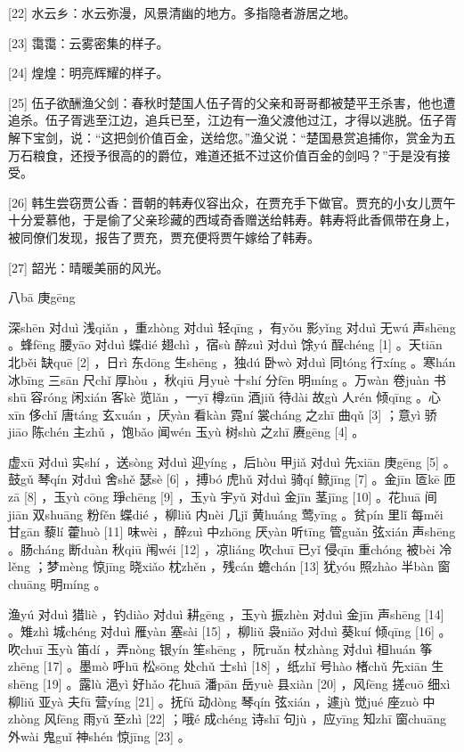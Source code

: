 \documentclass[12pt,UTF8]{ctexbook}
\begin{document}
[22] 水云乡：水云弥漫，风景清幽的地方。多指隐者游居之地。

[23] 霭霭：云雾密集的样子。

[24] 煌煌：明亮辉耀的样子。

[25] 伍子欲酬渔父剑：春秋时楚国人伍子胥的父亲和哥哥都被楚平王杀害，他也遭追杀。伍子胥逃至江边，追兵已至，江边有一渔父渡他过江，才得以逃脱。伍子胥解下宝剑，说：“这把剑价值百金，送给您。”渔父说：“楚国悬赏追捕你，赏金为五万石粮食，还授予很高的的爵位，难道还抵不过这价值百金的剑吗？”于是没有接受。

[26] 韩生尝窃贾公香：晋朝的韩寿仪容出众，在贾充手下做官。贾充的小女儿贾午十分爱慕他，于是偷了父亲珍藏的西域奇香赠送给韩寿。韩寿将此香佩带在身上，被同僚们发现，报告了贾充，贾充便将贾午嫁给了韩寿。

[27] 韶光：晴暖美丽的风光。





八bā 庚gēng


深shēn 对duì 浅qiǎn ，重zhòng 对duì 轻qīng ，有yǒu 影yǐng 对duì 无wú 声shēng 。蜂fēng 腰yāo 对duì 蝶dié 翅chì ，宿sù 醉zuì 对duì 馀yú 酲chéng [1] 。天tiān 北běi 缺quē [2] ，日rì 东dōng 生shēng ，独dú 卧wò 对duì 同tóng 行xíng 。寒hán 冰bīng 三sān 尺chǐ 厚hòu ，秋qiū 月yuè 十shí 分fēn 明míng 。万wàn 卷juàn 书shū 容róng 闲xián 客kè 览lǎn ，一yī 樽zūn 酒jiǔ 待dài 故gù 人rén 倾qīng 。心xīn 侈chǐ 唐táng 玄xuán ，厌yàn 看kàn 霓ní 裳cháng 之zhī 曲qǔ [3] ；意yì 骄jiāo 陈chén 主zhǔ ，饱bǎo 闻wén 玉yù 树shù 之zhī 赓gēng [4] 。

虚xū 对duì 实shí ，送sòng 对duì 迎yíng ，后hòu 甲jiǎ 对duì 先xiān 庚gēng [5] 。鼓gǔ 琴qín 对duì 舍shě 瑟sè [6] ，搏bó 虎hǔ 对duì 骑qí 鲸jīng [7] 。金jīn 匼kē 匝zā [8] ，玉yù cōng 琤chēng [9] ，玉yù 宇yǔ 对duì 金jīn 茎jīng [10] 。花huā 间jiān 双shuāng 粉fěn 蝶dié ，柳liǔ 内nèi 几jǐ 黄huáng 莺yīng 。贫pín 里lǐ 每měi 甘gān 藜lí 藿huò [11] 味wèi ，醉zuì 中zhōng 厌yàn 听tīng 管guǎn 弦xián 声shēng 。肠cháng 断duàn 秋qiū 闱wéi [12] ，凉liáng 吹chuī 已yǐ 侵qīn 重chóng 被bèi 冷lěng ；梦mèng 惊jīng 晓xiǎo 枕zhěn ，残cán 蟾chán [13] 犹yóu 照zhào 半bàn 窗chuāng 明míng 。

渔yú 对duì 猎liè ，钓diào 对duì 耕gēng ，玉yù 振zhèn 对duì 金jīn 声shēng [14] 。雉zhì 城chéng 对duì 雁yàn 塞sài [15] ，柳liǔ 袅niǎo 对duì 葵kuí 倾qīng [16] 。吹chuī 玉yù 笛dí ，弄nòng 银yín 笙shēng ，阮ruǎn 杖zhàng 对duì 桓huán 筝zhēng [17] 。墨mò 呼hū 松sōng 处chǔ 士shì [18] ，纸zhǐ 号hào 楮chǔ 先xiān 生shēng [19] 。露lù 浥yì 好hǎo 花huā 潘pān 岳yuè 县xiàn [20] ，风fēng 搓cuō 细xì 柳liǔ 亚yà 夫fū 营yíng [21] 。抚fǔ 动dòng 琴qín 弦xián ，遽jù 觉jué 座zuò 中zhòng 风fēng 雨yǔ 至zhì [22] ；哦é 成chéng 诗shī 句jù ，应yīng 知zhī 窗chuāng 外wài 鬼guǐ 神shén 惊jīng [23] 。
\end{document}
